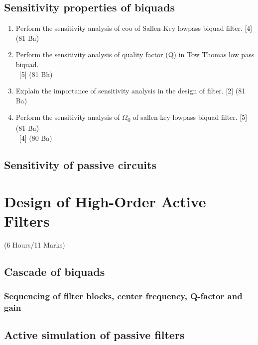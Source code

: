 \documentclass[12pt]{article}
\newcommand{\W}{\(\Omega\)}
\newcommand{\enter}{\\\textcolor{white}{1}}
\begin{document}
\subsection{Sensitivity properties of biquads}
\begin{enumerate}
    \item Perform the sensitivity analysis of coo of Sallen-Key lowpass biquad filter. \hfill [4] (81 Ba)

\item Perform the sensitivity analysis of quality factor (Q) in Tow Thomas low pass biquad.
\enter\hfill [5] (81 Bh)
\item Explain the importance of sensitivity analysis in the design of filter. \hfill[2] (81 Ba)
\item Perform the sensitivity analysis of \W\textsubscript{0} of sallen-key lowpass biquad filter. \hfill [5] (81 Ba)
\enter \hfill [4] (80 Ba)
\end{enumerate}
\subsection{Sensitivity of passive circuits}

\pagebreak
\section{Design of High-Order Active Filters}
\begin{center}(6 Hours/11 Marks)\end{center}
\subsection{Cascade of biquads}
\subsubsection{Sequencing of filter blocks, center frequency, Q-factor and gain}
\subsection{Active simulation of passive filters}
\end{document}
